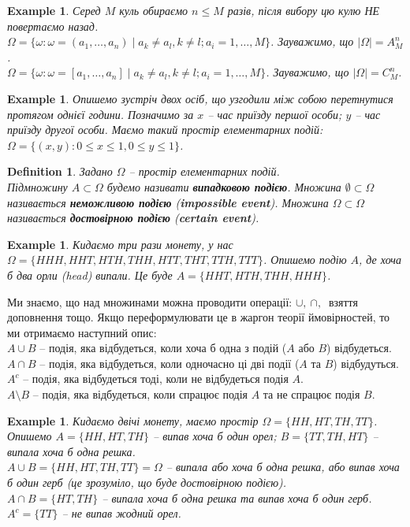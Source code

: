\documentclass[a4paper, 10pt]{article}
\theoremstyle{theoremdd}
\newtheorem{definition}[theorem]{Definition}
\newtheorem{example}[theorem]{Example}
\begin{document}
\begin{example}
Серед $M$ куль обираємо $n \leq M$ разів, після вибору цю кулю НЕ повертаємо назад.\\
$\Omega = \{\omega : \omega = (a_1,\dots,a_n) \mid a_k \neq a_l, k \neq l; a_i = 1,\dots,M\}$. Зауважимо, що $|\Omega| = A_M^n$.\\
$\Omega = \{\omega : \omega = [a_1,\dots,a_n] \mid a_k \neq a_l, k \neq l; a_i = 1,\dots,M\}$. Зауважимо, що $|\Omega| = C_M^n$.
\end{example}

\begin{example}
Опишемо зустріч двох осіб, що узгодили між собою перетнутися протягом однієї години. Позначимо за $x$ -- час приїзду першої особи; $y$ -- час приїзду другої особи. Маємо такий простір елементарних подій: $\Omega = \{ (x,y) : 0 \leq x \leq 1, 0 \leq y \leq 1\}$.
\end{example}

\begin{definition}
Задано $\Omega$ -- простір елементарних подій.\\
Підмножину $A \subset \Omega$ будемо називати \textbf{випадковою подією}. Множина $\emptyset \subset \Omega$ називається \textbf{неможливою подією} (\textbf{impossible event}). Множина $\Omega \subset \Omega$ називається \textbf{достовірною подією} (\textbf{certain event}).
\end{definition}

\begin{example}
Кидаємо три рази монету, у нас $\Omega = \{ HHH, HHT, HTH, THH, HTT, THT, TTH, TTT \}$. Опишемо подію $A$, де хоча б два орли (head) випали. Це буде $A = \{HHT, HTH, THH, HHH\}$.
\end{example}
\noindent
Ми знаємо, що над множинами можна проводити операції: $\cup,\ \cap,\ $ взяття доповнення тощо. Якщо переформулювати це в жаргон теорії ймовірностей, то ми отримаємо наступний опис:\\
$A \cup B$ -- подія, яка відбудеться, коли хоча б одна з подій ($A$ або $B$) відбудеться.\\
$A \cap B$ -- подія, яка відбудеться, коли одночасно ці дві події ($A$ та $B$) відбудуться.\\
$A^c$ -- подія, яка відбудеться тоді, коли не відбудеться подія $A$.\\
$A \setminus B$ -- подія, яка відбудеться, коли спрацює подія $A$ та не спрацює подія $B$.

\begin{example}
Кидаємо двічі монету, маємо простір $\Omega = \{HH,HT,TH,TT\}$. Опишемо $A = \{HH,HT,TH\}$ -- випав хоча б один орел; $B = \{TT,TH,HT\}$ -- випала хоча б одна решка.\\
$A \cup B = \{HH,HT,TH,TT\} = \Omega$ -- випала або хоча б одна решка, або випав хоча б один герб (це зрозуміло, що буде достовірною подією).\\
$A \cap B = \{HT,TH\}$ -- випала хоча б одна решка та випав хоча б один герб.\\
$A^c = \{TT\}$ -- не випав жодний орел.
\end{example}
\end{document}
